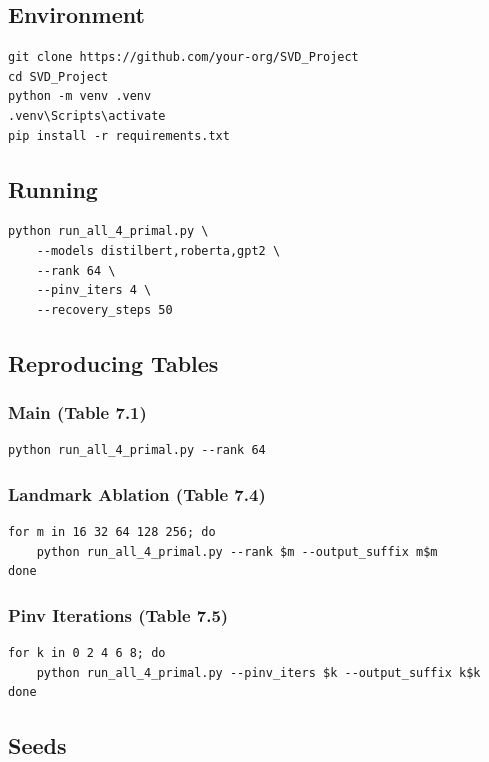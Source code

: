 \subsection{Environment}

\begin{lstlisting}
git clone https://github.com/your-org/SVD_Project
cd SVD_Project
python -m venv .venv
.venv\Scripts\activate
pip install -r requirements.txt
\end{lstlisting}

\subsection{Running}

\begin{lstlisting}
python run_all_4_primal.py \
    --models distilbert,roberta,gpt2 \
    --rank 64 \
    --pinv_iters 4 \
    --recovery_steps 50
\end{lstlisting}

\subsection{Reproducing Tables}

\subsubsection{Main (Table 7.1)}
\begin{lstlisting}
python run_all_4_primal.py --rank 64
\end{lstlisting}

\subsubsection{Landmark Ablation (Table 7.4)}
\begin{lstlisting}
for m in 16 32 64 128 256; do
    python run_all_4_primal.py --rank $m --output_suffix m$m
done
\end{lstlisting}

\subsubsection{Pinv Iterations (Table 7.5)}
\begin{lstlisting}
for k in 0 2 4 6 8; do
    python run_all_4_primal.py --pinv_iters $k --output_suffix k$k
done
\end{lstlisting}

\subsection{Seeds}

